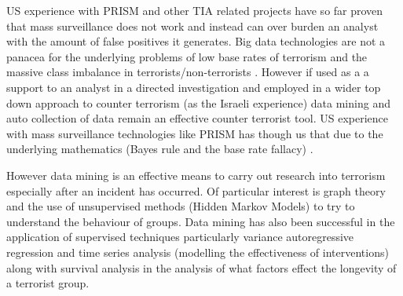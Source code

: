 US experience with PRISM and other TIA related projects have so far proven that mass
surveillance does not work and instead can over burden an analyst with the amount of false positives it generates. Big data technologies are not a panacea for the underlying problems  of low base rates of terrorism and the massive class imbalance in terrorists/non-terrorists \citep{Masssurvelilancefail2015}. However if used as a a support to an analyst in a directed investigation and employed in a wider top down approach to counter terrorism (as the Israeli experience) data mining and auto collection of data remain an effective counter terrorist tool. US experience with mass surveillance technologies like
PRISM has though us that  due to the underlying mathematics (Bayes rule and the base rate fallacy) \citep{schneier2015data}. 

However data mining is an effective means to carry out research into terrorism especially after an incident has occurred. Of particular interest is graph theory and the use of unsupervised methods (Hidden Markov Models) to try to understand the behaviour of groups. Data mining has also been successful in the application of supervised techniques particularly variance autoregressive regression and time series analysis (modelling the effectiveness of interventions) along with survival analysis in the analysis of what factors effect the longevity of a terrorist group.  

 

